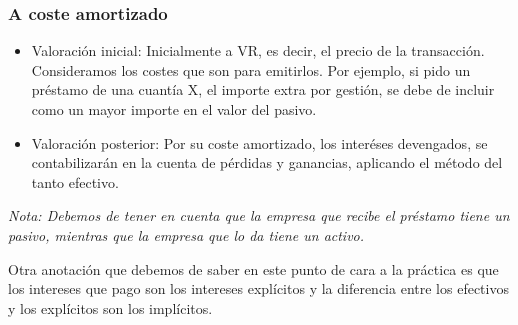 \subsubsection{A coste amortizado}
\begin{itemize}
    \item Valoración inicial: Inicialmente a VR, es decir, el precio de la transacción. Consideramos los costes que son para emitirlos. Por ejemplo, si pido un préstamo de una cuantía X, el importe extra por gestión, se debe de incluir como un mayor importe en el valor del pasivo.
    \item Valoración posterior: Por su coste amortizado, los interéses devengados, se contabilizarán en la cuenta de pérdidas y ganancias, aplicando el método del tanto efectivo.
\end{itemize}

\textit{Nota: Debemos de tener en cuenta que la empresa que recibe el préstamo tiene un pasivo, mientras que la empresa que lo da tiene un activo.}

\begin{tcolorbox}[colframe=blue!50!black, colback=blue!5!white]
Otra anotación que debemos de saber en este punto de cara a la práctica es que los intereses que pago son los intereses explícitos y la diferencia entre los efectivos y los explícitos son los implícitos.
\end{tcolorbox}
